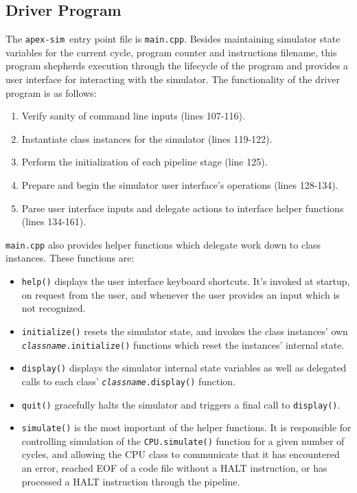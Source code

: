 \documentclass[12pt]{article}
\newcommand{\codename}[0]{\texttt{apex-sim}~}
\begin{document}
\subsection{Driver Program}
\label{sec:driver}
The \codename entry point file is \texttt{main.cpp}. Besides maintaining simulator state variables for the current cycle, program counter and instructions filename, this program shepherds execution through the lifecycle of the program and provides a user interface for interacting with the simulator. The functionality of the driver program is as follows:
\begin{enumerate}
  \item Verify sanity of command line inputs (lines 107-116).
  \item Instantiate class instances for the simulator (lines 119-122).
  \item Perform the initialization of each pipeline stage (line 125).
  \item Prepare and begin the simulator user interface's operations (lines 128-134).
  \item Parse user interface inputs and delegate actions to interface helper functions (lines 134-161).
\end{enumerate}

\texttt{main.cpp} also provides helper functions which delegate work down to class instances. These functions are:
\begin{itemize}
  \item \texttt{help()} displays the user interface keyboard shortcuts. It's invoked at startup, on request from the user, and whenever the user provides an input which is not recognized.
  \item \texttt{initialize()} resets the simulator state, and invokes the class instances' own \texttt{\textit{classname}.initialize()} functions which reset the instances' internal state.
  \item \texttt{display()} displays the simulator internal state variables as well as delegated calls to each class' \texttt{\textit{classname}.display()} function.
  \item \texttt{quit()} gracefully halts the simulator and triggers a final call to \texttt{display()}.
  \item \texttt{simulate()} is the most important of the helper functions. It is responsible for controlling simulation of the \texttt{CPU.simulate()} function for a given number of cycles, and allowing the CPU class to communicate that it has encountered an error, reached EOF of a code file without a HALT instruction, or has processed a HALT instruction through the pipeline.
\end{itemize}
\end{document}
